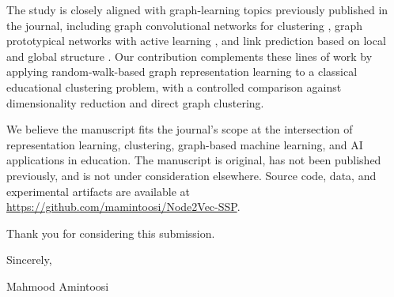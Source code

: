 \documentclass{article}
\begin{document}
The study is closely aligned with graph-learning topics previously published in the journal, including graph convolutional networks for clustering \cite{AlJreidy2024Clustering}, graph prototypical networks with active learning \cite{Solgi2022GraphPrototypical}, and link prediction based on local and global structure \cite{Luo2022LinkPrediction}. Our contribution complements these lines of work by applying random-walk-based graph representation learning to a classical educational clustering problem, with a controlled comparison against dimensionality reduction and direct graph clustering.

We believe the manuscript fits the journal's scope at the intersection of representation learning, clustering, graph-based machine learning, and AI applications in education. The manuscript is original, has not been published previously, and is not under consideration elsewhere. Source code, data, and experimental artifacts are available at \url{https://github.com/mamintoosi/Node2Vec-SSP}.

Thank you for considering this submission.

\bigskip

Sincerely,

Mahmood Amintoosi



\end{document}
